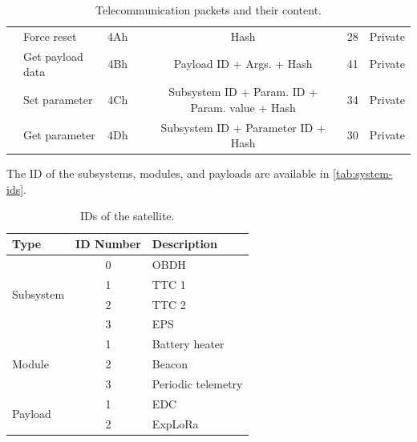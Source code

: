 \begin{landscape}
\begin{table}[!ht]
\begin{tabular}{llccccc}
                                      & Force reset           & 4Ah &                                     & Hash                                           & 28                    & Private \\
                                      & Get payload data      & 4Bh &                                     & Payload \acs{ID} + Args. + Hash                      & 41                    & Private \\
                                      & Set parameter         & 4Ch &                                     & Subsystem \acs{ID} + Param. \acs{ID} + Param. value + Hash & 34                    & Private \\
                                      & Get parameter         & 4Dh &                                     & Subsystem \acs{ID} + Parameter \acs{ID} + Hash             & 30                    & Private \\
            \bottomrule[1.5pt]
        \end{tabular}
        \caption{Telecommunication packets and their content.}
        \label{tab:packets-struct}
    \end{table}
\end{landscape}

The \ac{ID} of the subsystems, modules, and payloads are available in \autoref{tab:system-ids}.

\begin{table}[!ht]
    \centering
    \begin{tabular}{lcl}
        \toprule[1.5pt]
        \textbf{Type} & \textbf{\acs{ID} Number} & \textbf{Description} \\
        \midrule
        \multirow{4}{*}{Subsystem} & 0 & \ac{OBDH} \\
                                   & 1 & \ac{TTC} 1 \\
                                   & 2 & \ac{TTC} 2 \\
                                   & 3 & \ac{EPS} \\
        \midrule
        \multirow{3}{*}{Module}    & 1 & Battery heater \\
                                   & 2 & Beacon \\
                                   & 3 & Periodic telemetry \\
        \midrule
        \multirow{2}{*}{Payload}   & 1 & \ac{EDC} \\
                                   & 2 & ExpLoRa \\
        \bottomrule[1.5pt]
    \end{tabular}
    \caption{\acp{ID} of the satellite.}
    \label{tab:system-ids}
\end{table}


